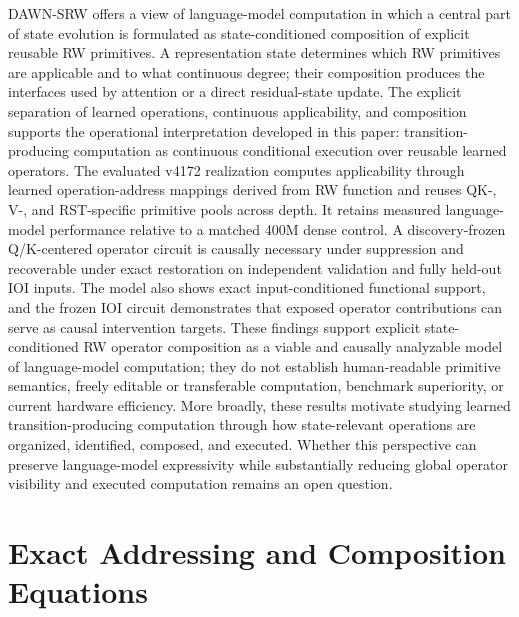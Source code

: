 \documentclass{article}
\newcommand{\DAWN}{DAWN-SRW}
\begin{document}
\DAWN{} offers a view of language-model computation in which a central part of
state evolution is formulated as state-conditioned composition of explicit
reusable RW primitives. A representation state determines which RW primitives
are applicable and to what continuous degree; their composition produces the
interfaces used by attention or a direct residual-state update. The
explicit separation of learned operations, continuous applicability, and
composition supports the operational interpretation developed in this paper:
transition-producing computation as continuous conditional execution over reusable
learned operators. The
evaluated v4172 realization computes applicability through learned
operation-address mappings derived from RW function and reuses QK-, V-, and
RST-specific primitive pools across depth. It retains measured language-model performance
relative to a matched 400M dense control. A discovery-frozen Q/K-centered
operator circuit is causally necessary under suppression and recoverable under
exact restoration on independent validation and fully held-out IOI inputs. The
model also shows exact input-conditioned functional support, and the frozen IOI
circuit demonstrates that exposed operator contributions can serve as causal
intervention targets. These findings support explicit state-conditioned RW
operator composition as a viable and causally analyzable model of
language-model computation; they do not establish human-readable primitive
semantics, freely editable or transferable computation, benchmark superiority,
or current hardware efficiency. More broadly, these results motivate studying
learned transition-producing computation through how state-relevant operations
are organized, identified, composed, and executed. Whether this perspective can
preserve language-model expressivity while substantially reducing global
operator visibility and executed computation remains an open question.

\appendix

\section{Exact Addressing and Composition Equations}
\label{app:equations}
\end{document}
